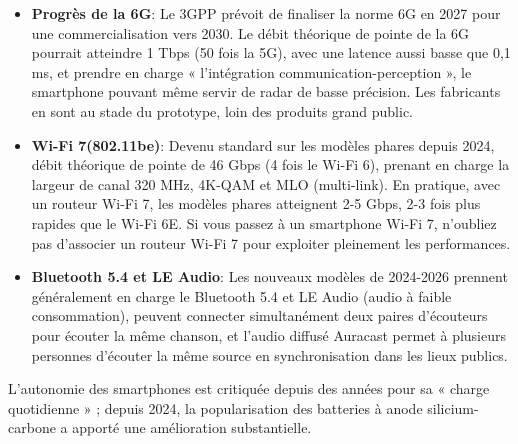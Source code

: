 \begin{itemize}
  \item \textbf{Progrès de la 6G}: Le 3GPP prévoit de finaliser la norme 6G en 2027 pour une commercialisation vers 2030. Le débit théorique de pointe de la 6G pourrait atteindre 1 Tbps (50 fois la 5G), avec une latence aussi basse que 0,1 ms, et prendre en charge « l'intégration communication-perception », le smartphone pouvant même servir de radar de basse précision. Les fabricants en sont au stade du prototype, loin des produits grand public.
  \item \textbf{Wi-Fi 7(802.11be)}: Devenu standard sur les modèles phares depuis 2024, débit théorique de pointe de 46 Gbps (4 fois le Wi-Fi 6), prenant en charge la largeur de canal 320 MHz, 4K-QAM et MLO (multi-link). En pratique, avec un routeur Wi-Fi 7, les modèles phares atteignent 2-5 Gbps, 2-3 fois plus rapides que le Wi-Fi 6E. Si vous passez à un smartphone Wi-Fi 7, n'oubliez pas d'associer un routeur Wi-Fi 7 pour exploiter pleinement les performances.
  \item \textbf{Bluetooth 5.4 et LE Audio}: Les nouveaux modèles de 2024-2026 prennent généralement en charge le Bluetooth 5.4 et LE Audio (audio à faible consommation), peuvent connecter simultanément deux paires d'écouteurs pour écouter la même chanson, et l'audio diffusé Auracast permet à plusieurs personnes d'écouter la même source en synchronisation dans les lieux publics.
\end{itemize}


L'autonomie des smartphones est critiquée depuis des années pour sa « charge quotidienne » ; depuis 2024, la popularisation des batteries à anode silicium-carbone a apporté une amélioration substantielle.

